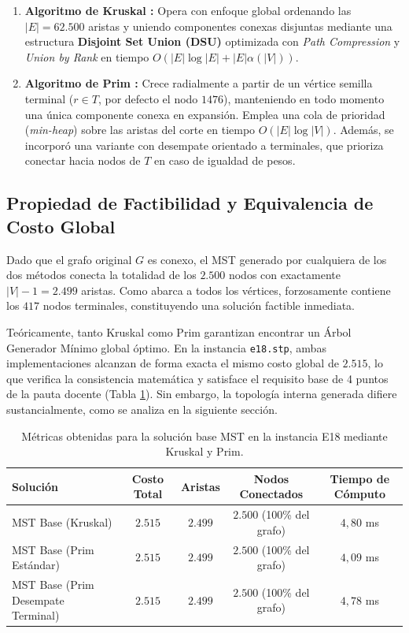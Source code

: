 \documentclass[11pt,a4paper]{article}
\begin{document}
\begin{enumerate}
    \item \textbf{Algoritmo de Kruskal \cite{kruskal1956shortest}:} Opera con enfoque global ordenando las $|E| = 62.500$ aristas y uniendo componentes conexas disjuntas mediante una estructura \textbf{Disjoint Set Union (DSU)} optimizada con \textit{Path Compression} y \textit{Union by Rank} en tiempo $O(|E| \log |E| + |E|\alpha(|V|))$.
    \item \textbf{Algoritmo de Prim \cite{prim1957shortest}:} Crece radialmente a partir de un vértice semilla terminal ($r \in T$, por defecto el nodo $1476$), manteniendo en todo momento una única componente conexa en expansión. Emplea una cola de prioridad (\textit{min-heap}) sobre las aristas del corte en tiempo $O(|E| \log |V|)$. Además, se incorporó una variante con desempate orientado a terminales, que prioriza conectar hacia nodos de $T$ en caso de igualdad de pesos.
\end{enumerate}

\subsection{Propiedad de Factibilidad y Equivalencia de Costo Global}
Dado que el grafo original $G$ es conexo, el MST generado por cualquiera de los dos métodos conecta la totalidad de los $2.500$ nodos con exactamente $|V| - 1 = 2.499$ aristas. Como abarca a todos los vértices, forzosamente contiene los $417$ nodos terminales, constituyendo una solución factible inmediata.

Teóricamente, tanto Kruskal como Prim garantizan encontrar un Árbol Generador Mínimo global óptimo. En la instancia \texttt{e18.stp}, ambas implementaciones alcanzan de forma exacta el mismo costo global de $\mathbf{2.515}$, lo que verifica la consistencia matemática y satisface el requisito base de 4 puntos de la pauta docente (Tabla \ref{tab:mst_base}). Sin embargo, la topología interna generada difiere sustancialmente, como se analiza en la siguiente sección.

\begin{table}[h]
\centering
\small
\caption{Métricas obtenidas para la solución base MST en la instancia E18 mediante Kruskal y Prim.}
\label{tab:mst_base}
\begin{tabular}{lcccc}
\toprule
\textbf{Solución} & \textbf{Costo Total} & \textbf{Aristas} & \textbf{Nodos Conectados} & \textbf{Tiempo de Cómputo} \\
\midrule
MST Base (Kruskal) & $2.515$ & $2.499$ & $2.500$ (100\% del grafo) & $4,80$ ms \\
MST Base (Prim Estándar) & $2.515$ & $2.499$ & $2.500$ (100\% del grafo) & $4,09$ ms \\
MST Base (Prim Desempate Terminal) & $2.515$ & $2.499$ & $2.500$ (100\% del grafo) & $4,78$ ms \\
\bottomrule
\end{tabular}
\end{table}
\end{document}

